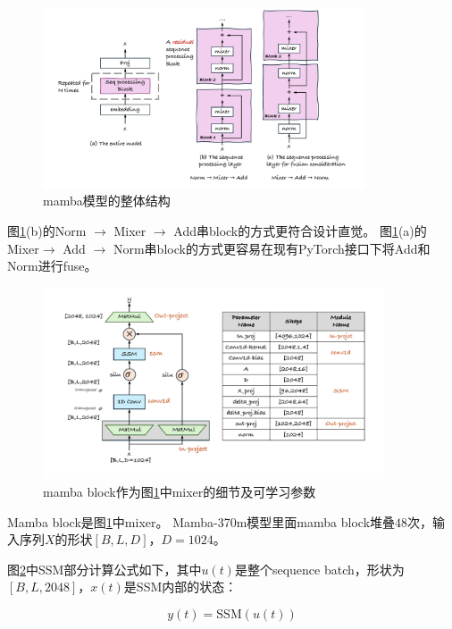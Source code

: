 \begin{figure}[h]
  \centering
  \includegraphics[width=0.85\textwidth]{figures/mamba-model.pdf}
  \caption{mamba模型的整体结构}\label{fig:mamba-model}
\end{figure}

图\ref{fig:mamba-model}(b)的Norm $\rightarrow$ Mixer $\rightarrow$ Add串block的方式更符合设计直觉。
图\ref{fig:mamba-model}(a)的Mixer$\rightarrow$ Add $\rightarrow$ Norm串block的方式更容易在现有PyTorch接口下将Add和Norm进行fuse。

\begin{figure}[h]
  \centering
  \includegraphics[width=0.9\textwidth]{figures/mamba-mixer.pdf}
  \caption{mamba block作为图\ref{fig:mamba-model}中mixer的细节及可学习参数}\label{fig:mamba-mixer}
\end{figure}

Mamba block是图\ref{fig:mamba-model}中mixer。
Mamba-370m模型里面mamba block堆叠$48$次，输入序列$X$的形状$[B,L,D]$，$D=1024$。

图\ref{fig:mamba-mixer}中SSM部分计算公式如下，其中$u(t)$是整个sequence batch，形状为$[B,L,2048]$，$x(t)$是SSM内部的状态：

\begin{equation}
y(t) = \text{SSM}(u(t)) \label{eq:ssm-0}
\end{equation}

